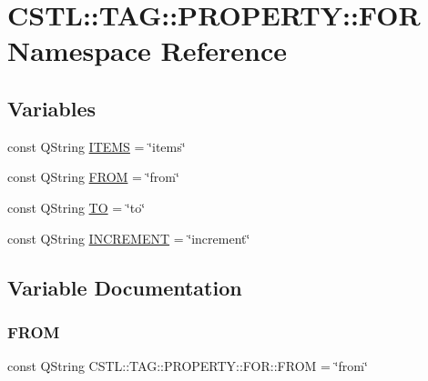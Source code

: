 \hypertarget{namespace_c_s_t_l_1_1_t_a_g_1_1_p_r_o_p_e_r_t_y_1_1_f_o_r}{}\section{C\+S\+TL\+:\+:T\+AG\+:\+:P\+R\+O\+P\+E\+R\+TY\+:\+:F\+OR Namespace Reference}
\label{namespace_c_s_t_l_1_1_t_a_g_1_1_p_r_o_p_e_r_t_y_1_1_f_o_r}
\subsection*{Variables}
\begin{DoxyCompactItemize}
\item 
const Q\+String \hyperlink{namespace_c_s_t_l_1_1_t_a_g_1_1_p_r_o_p_e_r_t_y_1_1_f_o_r_a5dc2d27b55c01de0f255abf0dbd1d85e}{I\+T\+E\+MS} = \char`\"{}items\char`\"{}
\item 
const Q\+String \hyperlink{namespace_c_s_t_l_1_1_t_a_g_1_1_p_r_o_p_e_r_t_y_1_1_f_o_r_a5f0ae74b2cd1b1c7350defed12334d1c}{F\+R\+OM} = \char`\"{}from\char`\"{}
\item 
const Q\+String \hyperlink{namespace_c_s_t_l_1_1_t_a_g_1_1_p_r_o_p_e_r_t_y_1_1_f_o_r_aa4b3f4f5f07836bd5357976c8b8994f5}{TO} = \char`\"{}to\char`\"{}
\item 
const Q\+String \hyperlink{namespace_c_s_t_l_1_1_t_a_g_1_1_p_r_o_p_e_r_t_y_1_1_f_o_r_a417ea8f307e7bb951b59874db023a494}{I\+N\+C\+R\+E\+M\+E\+NT} = \char`\"{}increment\char`\"{}
\end{DoxyCompactItemize}


\subsection{Variable Documentation}
\mbox{\label{namespace_c_s_t_l_1_1_t_a_g_1_1_p_r_o_p_e_r_t_y_1_1_f_o_r_a5f0ae74b2cd1b1c7350defed12334d1c}} 
\subsubsection{\texorpdfstring{F\+R\+OM}{FROM}}
{\footnotesize\ttfamily const Q\+String C\+S\+T\+L\+::\+T\+A\+G\+::\+P\+R\+O\+P\+E\+R\+T\+Y\+::\+F\+O\+R\+::\+F\+R\+OM = \char`\"{}from\char`\"{}}

